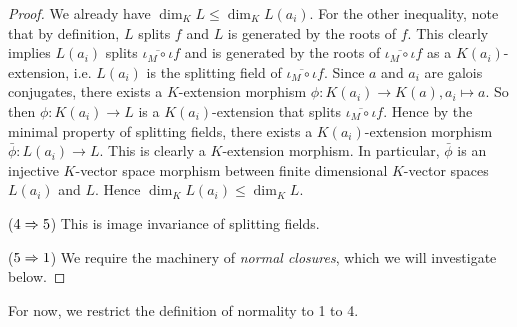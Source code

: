 \documentclass[../book.tex]{subfiles}
\begin{document}
\begin{proof}
        We already have $\dim_K L \leq \dim_K L(a_i)$.
        For the other inequality, note that by definition, 
        $L$ splits $f$ and $L$ is generated by the roots of $f$. 
        This clearly implies $L(a_i)$ splits $\overline{\iota_M \circ \iota} f$
        and is generated by the roots of $\overline{\iota_M \circ \iota} f$
        as a $K(a_i)$-extension, i.e.
        $L(a_i)$ is the splitting field of $\overline{\iota_M\circ\iota} f$.
        Since $a$ and $a_i$ are galois conjugates, 
        there exists a $K$-extension morphism $\phi : K(a_i) \to K(a), a_i \mapsto a$.
        So then $\phi : K(a_i) \to L$ is a $K(a_i)$-extension that splits
        $\overline{\iota_M\circ\iota} f$. 
        Hence by the minimal property of splitting fields, 
        there exists a $K(a_i)$-extension morphism $\bar\phi : L(a_i) \to L$. 
        This is clearly a $K$-extension morphism. 
        In particular, $\bar\phi$ is an injective $K$-vector space morphism
        between finite dimensional $K$-vector spaces $L(a_i)$ and $L$. 
        Hence $\dim_K L(a_i) \leq \dim_K L$. 
        
    ($4 \Rightarrow 5$)
        This is image invariance of splitting fields.
    
    ($5 \Rightarrow 1$)
        We require the machinery of \emph{normal closures}, which we will investigate below.
\end{proof}

For now, we restrict the definition of normality to 1 to 4. 
\end{document}
